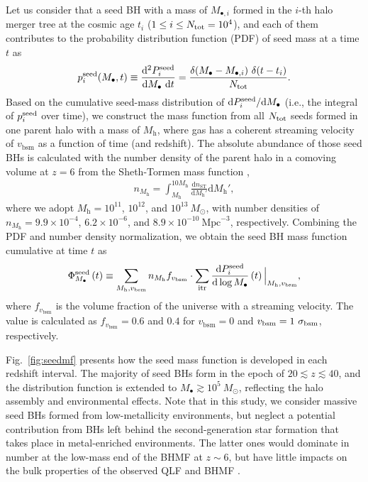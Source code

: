 \documentclass[twocolumn, twocolappendix]{aastex63}
\newcommand{\Msun}{M_\odot}
\newcommand{\Mh}{M_\mathrm{h}}
\newcommand{\Mbh}{M_\bullet}
\newcommand{\vbsm}{v_\mathrm{bsm}}
\newcommand{\D}{\mathrm{d}}
\begin{document}
\begin{CJK*}{UTF8}{gbsn}
Let us consider that a seed BH with a mass of $M_{\bullet,i}$ formed in the $i$-th halo merger tree at the cosmic age 
$t_i$ ($1\leq i \leq N_{\rm tot}=10^4$),
and each of them contributes to the probability distribution function (PDF) of seed mass at a time $t$ as
% 
\begin{equation}
  p^{\rm seed}_i (\Mbh,t)\equiv \frac{\D^2 P^{\rm seed}_i}{\D \Mbh ~\D t}= \frac{ \delta(\Mbh-M_{\bullet,i})~ \delta(t-t_i)}{N_{\rm tot}}.
\end{equation}
%
Based on the cumulative seed-mass distribution of $\D P^{\rm seed}_i/ \D \Mbh$
(i.e., the integral of $p^{\rm seed}_i$ over time),
we construct the mass function from all $N_{\rm tot}$ seeds formed in one parent halo
with a mass of $\Mh$, where gas has a coherent streaming velocity of $\vbsm$ as a function of time (and redshift).
The absolute abundance of those seed BHs is calculated with the number density of the parent halo in a comoving volume at $z=6$ 
from the Sheth-Tormen mass function \citep{2001MNRAS.323....1S},
%
\begin{align}
  n_{\Mh}= \int_{\Mh}^{10\Mh}  \frac{\D n_{\mathrm{ST}}} {\D \Mh'} \D \Mh', 
\end{align}
%
where we adopt $\Mh = 10^{11}$, $10^{12}$, and $10^{13}~\Msun$, with number densities of
$n_{\Mh} = 9.9\times 10^{-4}$, $6.2\times 10^{-6}$, and $8.9\times 10^{-10}~ \text{Mpc}^{-3}$, respectively.
Combining the PDF and number density normalization, we obtain the seed BH mass function cumulative at time $t$ as
%
\begin{align}
\Phi_{\Mbh}^{\rm seed}\left(t\right) \equiv \sum_{\Mh, \vbsm} n_{\Mh} f_{\vbsm} 
\cdot \sum_{\rm itr} \frac{\D P^{\rm seed}_i}{\D \log \Mbh}\left(t\right) \Big| _{\Mh, \vbsm},
\end{align}
%
where $f_{\vbsm}$ is the volume fraction of the universe with a streaming velocity.
The value is calculated as $f_{\vbsm} = 0.6$ and $0.4$ for $\vbsm = 0$ and $\vbsm=1~\sigma_{\rm bsm}$, respectively.

Fig.~\ref{fig:seedmf} presents how the seed mass function is developed in each redshift interval.
The majority of seed BHs form in the epoch of $20\lesssim z \lesssim 40$, and the distribution function is 
extended to $M_\bullet \gtrsim 10^5~\Msun$, reflecting the halo assembly and environmental effects.
Note that in this study, we consider massive seed BHs formed from low-metallicity environments,
but neglect a potential contribution from BHs left behind the second-generation star formation
that takes place in metal-enriched environments.
The latter ones would dominate in number at the low-mass end of the BHMF at $z\sim 6$,
but have little impacts on the bulk properties of the observed QLF and BHMF \citep[see][]{2022MNRAS.511..616T}.




\end{CJK*}
\end{document}

